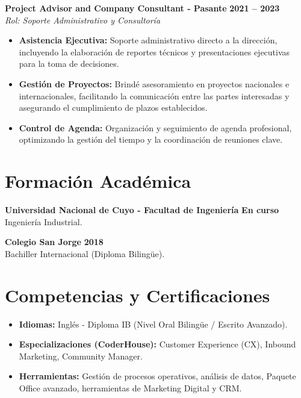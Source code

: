\documentclass[11pt,a4paper,sans]{article}
\begin{document}
\noindent \textbf{Project Advisor and Company Consultant - Pasante} \hfill \textbf{2021 -- 2023} \\
\textit{Rol: Soporte Administrativo y Consultoría}
\begin{itemize}[leftmargin=1.5em, labelsep=0.5em, itemsep=4pt]
    \item \textbf{Asistencia Ejecutiva:} Soporte administrativo directo a la dirección, incluyendo la elaboración de reportes técnicos y presentaciones ejecutivas para la toma de decisiones.
    \item \textbf{Gestión de Proyectos:} Brindé asesoramiento en proyectos nacionales e internacionales, facilitando la comunicación entre las partes interesadas y asegurando el cumplimiento de plazos establecidos.
    \item \textbf{Control de Agenda:} Organización y seguimiento de agenda profesional, optimizando la gestión del tiempo y la coordinación de reuniones clave.
\end{itemize}

\section*{Formación Académica}

\noindent \textbf{Universidad Nacional de Cuyo - Facultad de Ingeniería} \hfill \textbf{En curso} \\
Ingeniería Industrial.

\vspace{6pt}

\noindent \textbf{Colegio San Jorge} \hfill \textbf{2018} \\
Bachiller Internacional (Diploma Bilingüe).

\section*{Competencias y Certificaciones}
\begin{itemize}[leftmargin=1.5em, labelsep=0.5em, itemsep=3pt]
    \item \textbf{Idiomas:} Inglés - Diploma IB (Nivel Oral Bilingüe / Escrito Avanzado).
    \item \textbf{Especializaciones (CoderHouse):} Customer Experience (CX), Inbound Marketing, Community Manager.
    \item \textbf{Herramientas:} Gestión de procesos operativos, análisis de datos, Paquete Office avanzado, herramientas de Marketing Digital y CRM.
\end{itemize}
\end{document}
